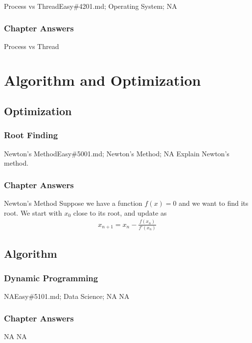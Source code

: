 \documentclass[oldfontcommands]{memoir}
\begin{document}
{\begin{question}{Process vs Thread}{Easy}{\#4201.md; Operating System; NA}
\end{question}

\newpage\section{Chapter Answers}\begin{answer}{Process vs Thread}
\end{answer}
\part{Algorithm and Optimization}
\chapter{Optimization}
\minitoc
\section{Root Finding}
\begin{question}{Newton's Method}{Easy}{\#5001.md; Newton's Method; NA}
Explain Newton's method.

\end{question}

\newpage\section{Chapter Answers}\begin{answer}{Newton's Method}
Suppose we have a function $f(x) = 0$ and we want to find its root. We start with $x_0$ close to its root, and update as
\begin{align}
    x_{n+1} = x_n - \frac{f(x_n)}{f'(x_n)}
\end{align}
\end{answer}
\chapter{Algorithm}
\minitoc
\section{Dynamic Programming}
\begin{question}{NA}{Easy}{\#5101.md; Data Science; NA}
NA

\end{question}

\newpage\section{Chapter Answers}\begin{answer}{NA}
NA
\end{answer}
}
\end{document}
